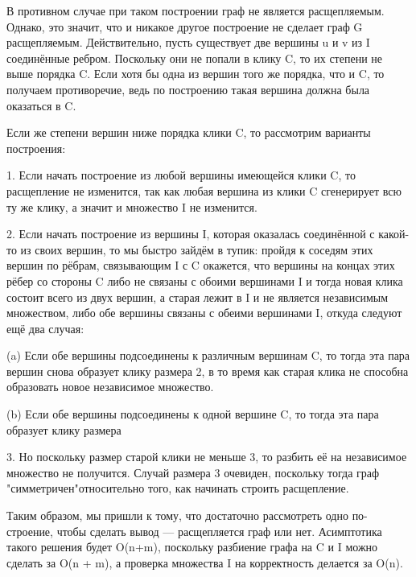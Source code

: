 \documentclass[12pt]{extarticle}
\begin{document}
В противном случае при таком построении граф не является расщепляемым. Однако, это значит, что и никакое другое построение не сделает граф G расщепляемым. Действительно, пусть
существует две вершины u и v из I соединённые ребром. Поскольку они не попали в клику C,
то их степени не выше порядка C. Если хотя бы одна из вершин того же порядка, что и C, то
получаем противоречие, ведь по построению такая вершина должна была оказаться в C.

Если же степени вершин ниже порядка клики C, то рассмотрим варианты построения:

1. Если начать построение из любой вершины имеющейся клики C, то расщепление не изменится, так как любая вершина из клики C сгенерирует всю ту же клику, а значит и множество
I не изменится.

2. Если начать построение из вершины I, которая оказалась соединённой с какой-то из своих
вершин, то мы быстро зайдём в тупик: пройдя к соседям этих вершин по рёбрам, связывающим I с C окажется, что вершины на концах этих рёбер со стороны C либо не связаны с
обоими вершинами I и тогда новая клика состоит всего из двух вершин, а старая лежит в I
и не является независимым множеством, либо обе вершины связаны с обеими вершинами I,
откуда следуют ещё два случая:

(a) Если обе вершины подсоединены к различным вершинам C, то тогда эта пара вершин
снова образует клику размера 2, в то время как старая клика не способна образовать
новое независимое множество.

(b) Если обе вершины подсоединены к одной вершине C, то тогда эта пара образует клику
размера

3. Но поскольку размер старой клики не меньше 3, то разбить её на независимое
множество не получится. Случай размера 3 очевиден, поскольку тогда граф "симметричен"относительно того, как начинать строить расщепление.

Таким образом, мы пришли к тому, что достаточно рассмотреть одно по-строение, чтобы сделать вывод — расщепляется граф или нет. Асимптотика такого решения будет O(n+m), поскольку
разбиение графа на C и I можно сделать за O(n + m), а проверка множества I на корректность
делается за O(n).
\end{document}
